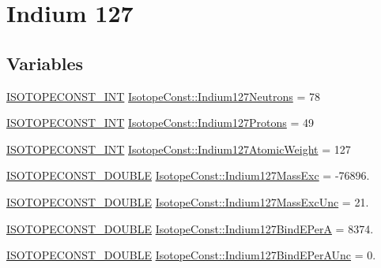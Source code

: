 \hypertarget{group___isotope_const-_indium-_in127}{}\section{Indium 127}
\label{group___isotope_const-_indium-_in127}
\subsection*{Variables}
\begin{DoxyCompactItemize}
\item 
\mbox{\hyperlink{group___isotope_const-_macros_ga5f18360b3e99483a35c32d789e62621c}{I\+S\+O\+T\+O\+P\+E\+C\+O\+N\+S\+T\+\_\+\+I\+NT}} \mbox{\hyperlink{group___isotope_const-_indium-_in127_ga97e3bd2474066b44fdc6e69656027132}{Isotope\+Const\+::\+Indium127\+Neutrons}} = 78
\item 
\mbox{\hyperlink{group___isotope_const-_macros_ga5f18360b3e99483a35c32d789e62621c}{I\+S\+O\+T\+O\+P\+E\+C\+O\+N\+S\+T\+\_\+\+I\+NT}} \mbox{\hyperlink{group___isotope_const-_indium-_in127_gabac16689dd6d421c205299e2fe479d38}{Isotope\+Const\+::\+Indium127\+Protons}} = 49
\item 
\mbox{\hyperlink{group___isotope_const-_macros_ga5f18360b3e99483a35c32d789e62621c}{I\+S\+O\+T\+O\+P\+E\+C\+O\+N\+S\+T\+\_\+\+I\+NT}} \mbox{\hyperlink{group___isotope_const-_indium-_in127_ga6468d331b83bb8278b7ca0e872dfd293}{Isotope\+Const\+::\+Indium127\+Atomic\+Weight}} = 127
\item 
\mbox{\hyperlink{group___isotope_const-_macros_ga8f45a7272ce02c0b4c65c44636ed719a}{I\+S\+O\+T\+O\+P\+E\+C\+O\+N\+S\+T\+\_\+\+D\+O\+U\+B\+LE}} \mbox{\hyperlink{group___isotope_const-_indium-_in127_ga612561dfaf242cf5d67462b14c76bc5d}{Isotope\+Const\+::\+Indium127\+Mass\+Exc}} = -\/76896.
\item 
\mbox{\hyperlink{group___isotope_const-_macros_ga8f45a7272ce02c0b4c65c44636ed719a}{I\+S\+O\+T\+O\+P\+E\+C\+O\+N\+S\+T\+\_\+\+D\+O\+U\+B\+LE}} \mbox{\hyperlink{group___isotope_const-_indium-_in127_gadf3a2dd4f479cc722839efaceec97fb2}{Isotope\+Const\+::\+Indium127\+Mass\+Exc\+Unc}} = 21.
\item 
\mbox{\hyperlink{group___isotope_const-_macros_ga8f45a7272ce02c0b4c65c44636ed719a}{I\+S\+O\+T\+O\+P\+E\+C\+O\+N\+S\+T\+\_\+\+D\+O\+U\+B\+LE}} \mbox{\hyperlink{group___isotope_const-_indium-_in127_ga19d341facfd6fe65be390389865bff49}{Isotope\+Const\+::\+Indium127\+Bind\+E\+PerA}} = 8374.
\item 
\mbox{\hyperlink{group___isotope_const-_macros_ga8f45a7272ce02c0b4c65c44636ed719a}{I\+S\+O\+T\+O\+P\+E\+C\+O\+N\+S\+T\+\_\+\+D\+O\+U\+B\+LE}} \mbox{\hyperlink{group___isotope_const-_indium-_in127_gafda516dc382d25cce977da2150c1ac91}{Isotope\+Const\+::\+Indium127\+Bind\+E\+Per\+A\+Unc}} = 0.

\end{DoxyCompactItemize}
